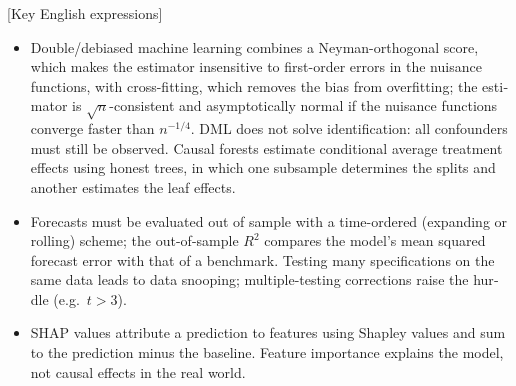 \begin{english}[Key English expressions]
\begin{itemize}
\item Double/debiased machine learning combines a Neyman-orthogonal score, which makes the estimator insensitive to first-order errors in the nuisance functions, with cross-fitting, which removes the bias from overfitting; the estimator is $\sqrt n$-consistent and asymptotically normal if the nuisance functions converge faster than $n^{-1/4}$. DML does not solve identification: all confounders must still be observed. Causal forests estimate conditional average treatment effects using honest trees, in which one subsample determines the splits and another estimates the leaf effects.
\item Forecasts must be evaluated out of sample with a time-ordered (expanding or rolling) scheme; the out-of-sample $R^2$ compares the model's mean squared forecast error with that of a benchmark. Testing many specifications on the same data leads to data snooping; multiple-testing corrections raise the hurdle (e.g.\ $t>3$).
\item SHAP values attribute a prediction to features using Shapley values and sum to the prediction minus the baseline. Feature importance explains the model, not causal effects in the real world.
\end{itemize}
\end{english}
\renewcommand{\arraystretch}{1.25}
